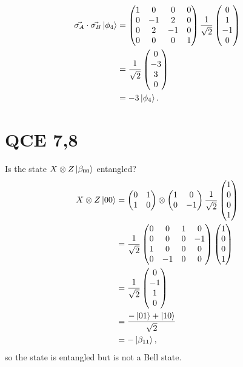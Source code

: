 \documentclass[10pt]{article}
\begin{document}
\begin{align*}
\vec{\sigma_A} \cdot \vec{\sigma_B} \ket{\phi_4} &= 
\begin{pmatrix}
1 & 0 & 0 & 0 \\
0 & -1 & 2 & 0 \\
0 & 2 & -1 & 0 \\
0 & 0 & 0 & 1
\end{pmatrix}
\frac{1}{\sqrt{2}}
\begin{pmatrix}
0 \\
1 \\
-1 \\
0
\end{pmatrix}  \\
&= 
\frac{1}{\sqrt{2}}
\begin{pmatrix}
0 \\
-3 \\
3 \\
0
\end{pmatrix} \\
&= -3 \ket{\phi_4}.
\end{align*}

\section*{QCE 7,8}
Is the state $X \otimes Z \ket{\beta_{00}}$ entangled?
\begin{align*}
X \otimes Z \ket{00} &= 
\begin{pmatrix}
0 & 1 \\
1 & 0 
\end{pmatrix}
\otimes
\begin{pmatrix}
1 & 0 \\
0 & - 1
\end{pmatrix}
\frac{1}{\sqrt{2}}
\begin{pmatrix}
1 \\ 0 \\ 0 \\ 1
\end{pmatrix} \\
&= 
\frac{1}{\sqrt{2}}
\begin{pmatrix}
0 & 0   & 1 & 0 \\
0 & 0   & 0 & -1 \\
1 & 0   & 0 & 0 \\
0 & -1 & 0 & 0 
\end{pmatrix}
\begin{pmatrix}
1 \\ 0 \\ 0 \\ 1
\end{pmatrix} \\
&= \frac{1}{\sqrt{2}}
\begin{pmatrix}
0 \\ -1 \\ 1 \\ 0
\end{pmatrix} \\
&= \frac{-\ket{01} + \ket{10}}{\sqrt{2}} \\
&= -\ket{\beta_{11}},
\end{align*}
so the state is entangled but is not a Bell state.
\end{document}
